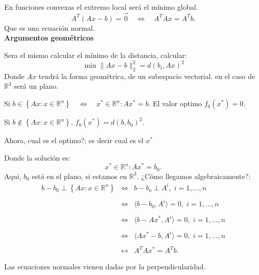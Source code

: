 \begin{ejem}
En funciones convexas el extremo local será el mínimo global.
$$A^T(Ax-b)=\overrightarrow{0}\quad \Leftrightarrow\quad A^TAx=A^Tb.$$
Que es una ecuación normal.\\

\textbf{Argumentos geométricos}

Sera el mismo calcular el mínimo de la distancia, calcular:
$$\min \|Ax-b\|^2_2 = d(b_i,Ax)^2$$
Donde $Ax$ tendrá la forma geométrica, de un subespacio vectorial. en el caso de $\mathbb{R}^3$ será un plano.
\begin{center}
\end{center}

Si $b\in \left\{Ax:x\in \mathbb{R}^n\right\}\quad \Leftrightarrow \quad x^* \in \mathbb{R}^n : Ax^* =b.$ El valor optimo $f_0(x^*)=0.$

Si $b\notin \left\{Ax:x\in \mathbb{R}^n\right\}$, $f_0(x^*)=d(b,b_0)^2$.

Ahora, cual es el optimo?; es decir cual es el $x^*$

Donde la solución es:
$$x^*\in \mathbb{R}^n : Ax^*=b_0.$$ Aquí, $b_0$ está en el plano, si estamos en $\mathbb{R}^3$. ¿Cómo llegamos algebraicamente?:
$$
\begin{array}{rcl}
b-b_0 \perp \left\{Ax:x\in \mathbb{R}^n\right\}&\Leftrightarrow & b-b_o \perp A^i,\; i=1,\ldots,n\\\\  
						 &\Leftrightarrow & \langle b-b_0,A^i\rangle=0,\; i=1,\ldots,n\\\\
							   &\Leftrightarrow& \langle b-Ax^*,A^i\rangle = 0, \; i=1,\ldots,n\\\\
							   &\Leftrightarrow& \langle Ax^*-b,A^i\rangle = 0, \; i=1,\ldots,n\\\\
								   &\leftrightarrow&A^TAx^*=A^Tb.
\end{array}
$$
\end{ejem}
Las ecuaciones normales vienen dadas por la perpendicularidad.

